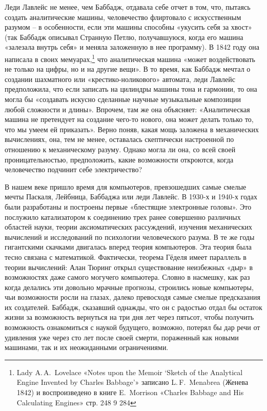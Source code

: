 \documentclass[../main.tex]{subfiles}
\begin{document}
Леди Лавлейс не менее, чем Баббадж, отдавала себе отчет в том, что, пытаясь создать аналитические машины, человечество флиртовало с искусственным разумом \--- в особенности, если эти машины способны «укусить себя за хвост» (так Баббадж описывал Странную Петлю, получавшуюся, когда его машина «залезала внутрь себя» и меняла заложенную в нее программу). В 1842 году она написала в своих мемуарах,\footnote{Lady A.\,A.~Lovelace «Notes upon the Memoir \enquote*{Sketch of the Analytical Engine Invented by Charles Babbage}» записано L.\,F.~Menabrea (Женева 1842) и воспроизведено в книге E.~Morrison «Charles Babbage and His Calculating Engines» стр. 248 9 284} что аналитическая машина «может воздействовать не только на цифры, но и на другие вещи». В то время, как Баббадж мечтал о создании шахматного или «крестико-ноликового» автомата, леди Лавлейс предположила, что если записать на цилиндры машины тона и гармонии, то она могла бы «создавать искусно сделанные научные музыкальные композиции любой сложности и длины». Впрочем, там же она объясняет: «Аналитическая машина не претендует на создание чего-то нового, она может делать только то, что мы умеем ей приказать». Верно поняв, какая мощь заложена в механических вычислениях, она, тем не менее, оставалась скептически настроенной по отношению к механическому разуму. Однако могла ли она, со всей своей проницательностью, предположить, какие возможности откроются, когда человечество подчинит себе электричество?

В нашем веке пришло время для компьютеров, превзошедших самые смелые мечты Паскаля, Лейбница, Баббаджа или леди Лавлейс. В 1930-х и 1940-х годах были разработаны и построены первые «блестящие электронные головы». Это послужило катализатором к соединению трех ранее совершенно различных областей науки, теории аксиоматических рассуждений, изучения механических вычислений и исследований по психологии человеческого разума. В те же годы гигантскими скачками двигалась вперед теория компьютеров. Эта теория была тесно связана с математикой. Фактически, теорема Гёделя имеет параллель в теории вычислений: Алан Тюринг открыл существование неизбежных «дыр» в возможностях даже самого могучего компьютера. Словно в насмешку, как раз когда делались эти довольно мрачные прогнозы, строились новые компьютеры, чьи возможности росли на глазах, далеко превосходя самые смелые предсказания их создателей. Баббадж, сказавший однажды, что он с радостью отдал бы остаток жизни за возможность вернуться на три дня лет через пятьсот, чтобы получить возможность ознакомиться с наукой будущего, возможно, потерял бы дар речи от удивления уже через сто лет после своей смерти, пораженный как новыми машинами, так и их неожиданными ограничениями.
\end{document}
